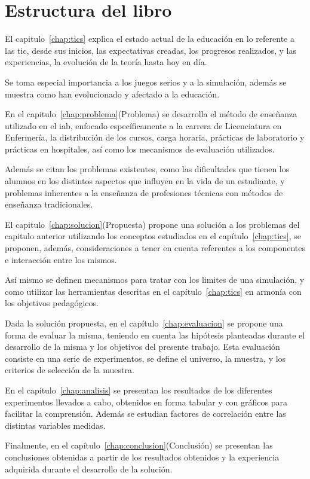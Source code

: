 \section{Estructura del libro}

El capitulo~\ref{chap:tics} explica el estado actual de la educación en lo
referente a las \Gls{tic}, desde sus inicios, las expectativas creadas, los
progresos realizados, y las experiencias, la evolución de la teoría hasta hoy en
día.

Se toma especial importancia a los juegos serios y a la simulación, además se
muestra como han evolucionado y afectado a la educación.


En el capitulo~\ref{chap:problema}(Problema) se desarrolla el método de
enseñanza utilizado en el \Gls{iab}, enfocado específicamente a la carrera de
Licenciatura en Enfermería, la distribución de los cursos, carga horaria,
prácticas de laboratorio y prácticas en hospitales, así como los mecanismos de
evaluación utilizados.

Además se citan los problemas existentes, como las dificultades que tienen los
alumnos en los distintos aspectos que influyen en la vida de un estudiante, y
problemas inherentes a la enseñanza de profesiones técnicas con métodos de
enseñanza tradicionales.


El capitulo~\ref{chap:solucion}(Propuesta) propone una solución a los problemas
del capitulo anterior utilizando los conceptos estudiados en el
capítulo~\ref{chap:tics}, se proponen, además, consideraciones a tener en cuenta
referentes a los componentes e interacción entre los mismos.

Así mismo se definen mecanismos para tratar con los limites de una simulación, y
como utilizar las herramientas descritas en el capítulo~\ref{chap:tics} en
armonía con los objetivos pedagógicos.


Dada la solución propuesta, en el capítulo~\ref{chap:evaluacion} se propone una
forma de evaluar la misma, teniendo en cuenta las hipótesis planteadas durante
el desarrollo de la misma y los objetivos del presente trabajo. Esta evaluación
consiste en una serie de experimentos, se define el universo, la muestra, y los
criterios de selección de la muestra.


En el capítulo~\ref{chap:analisis} se presentan los resultados de los diferentes
experimentos llevados a cabo, obtenidos en forma tabular y con gráficos para
facilitar la comprensión. Además se estudian factores de correlación entre las
distintas variables medidas.


Finalmente, en el capítulo~\ref{chap:conclusion}(Conclusión) se presentan las
conclusiones obtenidas a partir de los resultados obtenidos y la experiencia
adquirida durante el desarrollo de la solución.
